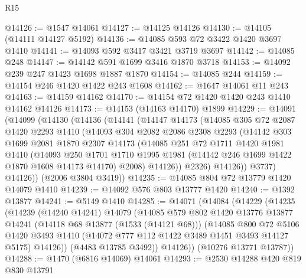 \begin{lexlean}{R15}
\begin{coremodule}
@14126 := @1547 @14061
@14127 := @14125 @14126
@14130 := @14105 (@14111 @14127 @5192)
@14136 := @14085 @593 @72 @3422 @1420 @3697 @1410
@14141 := @14093 @592 @3417 @3421 @3719 @3697
@14142 := @14085 @248
@14147 := @14142 @591 @1699 @3416 @1870 @3718
@14153 := @14092 @239 @247 @1423 @1698 @1887 @1870
@14154 := @14085 @244
@14159 := @14154 @246 @1420 @1422 @243 @1608
@14162 := @1647 @14061 @11 @243
@14163 := @14159 @14162
@14170 := @14154 @72 @1420 @1420 @243 @1410 @14162 @14126
@14173 := @14153 (@14163 @14170) @1899
@14229 := @14091
    (@14099
      (@14130
        (@14136
          (@14141
            (@14147
              @14173
              (@14085
                @305
                @72
                @2087
                @1420
                @2293
                @1410
                (@14093
                  @304
                  @2082
                  @2086
                  @2308
                  @2293
                  (@14142
                    @303
                    @1699
                    @2081
                    @1870
                    @2307
                    @14173
                    (@14085
                      @251
                      @72
                      @1711
                      @1420
                      @1981
                      @1410
                      (@14093
                        @250
                        @1701
                        @1710
                        @1995
                        @1981
                        (@14142 @246 @1699 @1422 @1870 @1608 @14173 @14170)
                        @2008)
                      @14126))
                  @2326)
                @14126))
            @3737)
          @14126))
      (@2006 @3804 @3419))
@14235 := @14085 @804 @72 @13779 @1420 @14079 @1410
@14239 := @14092 @576 @803 @13777 @1420
@14240 := @1392 @13877
@14241 := @5149 @1410
@14285 := @14071
    (@14084
      (@14229
        (@14235
          (@14239
            (@14240 @14241)
            @14079
            (@14085
              @579
              @802
              @1420
              @13776
              @13877
              @14241
              (@14118 @68 @13877 (@1533 (@14121 @68)))
              (@14085
                @800
                @72
                @5106
                @1420
                @3493
                @1410
                (@14072 @777 @112 @1422 @3489 @1451 @3493 @14127 @5175)
                @14126))
            (@4483 @13785 @3492))
          @14126))
      (@10276 @13771 @13787))
@14288 := @1470 (@6816 @14069) @14061
@14293 := @2530 @14288 @420 @819 @830 @13791

\end{coremodule}
\end{lexlean}
